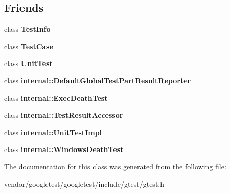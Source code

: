 \subsection*{Friends}
\begin{DoxyCompactItemize}
\item 
class {\bfseries Test\+Info}\hypertarget{classtesting_1_1TestResult_a4c49c2cdb6c328e6b709b4542f23de3c}{}\label{classtesting_1_1TestResult_a4c49c2cdb6c328e6b709b4542f23de3c}

\item 
class {\bfseries Test\+Case}\hypertarget{classtesting_1_1TestResult_aff779e55b06adfa7c0088bd10253f0f0}{}\label{classtesting_1_1TestResult_aff779e55b06adfa7c0088bd10253f0f0}

\item 
class {\bfseries Unit\+Test}\hypertarget{classtesting_1_1TestResult_a832b4d233efee1a32feb0f4190b30d39}{}\label{classtesting_1_1TestResult_a832b4d233efee1a32feb0f4190b30d39}

\item 
class {\bfseries internal\+::\+Default\+Global\+Test\+Part\+Result\+Reporter}\hypertarget{classtesting_1_1TestResult_abae39633da9932847b41cb80efd62115}{}\label{classtesting_1_1TestResult_abae39633da9932847b41cb80efd62115}

\item 
class {\bfseries internal\+::\+Exec\+Death\+Test}\hypertarget{classtesting_1_1TestResult_adf5553cae6aea6f8648d47e299237e34}{}\label{classtesting_1_1TestResult_adf5553cae6aea6f8648d47e299237e34}

\item 
class {\bfseries internal\+::\+Test\+Result\+Accessor}\hypertarget{classtesting_1_1TestResult_ae762da04e74a0d3b0daded3c5bd4a8e8}{}\label{classtesting_1_1TestResult_ae762da04e74a0d3b0daded3c5bd4a8e8}

\item 
class {\bfseries internal\+::\+Unit\+Test\+Impl}\hypertarget{classtesting_1_1TestResult_acc0a5e7573fd6ae7ad1878613bb86853}{}\label{classtesting_1_1TestResult_acc0a5e7573fd6ae7ad1878613bb86853}

\item 
class {\bfseries internal\+::\+Windows\+Death\+Test}\hypertarget{classtesting_1_1TestResult_a6aeedc04a0590fcc1b3c5f687dbb0f9f}{}\label{classtesting_1_1TestResult_a6aeedc04a0590fcc1b3c5f687dbb0f9f}

\end{DoxyCompactItemize}


The documentation for this class was generated from the following file\+:\begin{DoxyCompactItemize}
\item 
vendor/googletest/googletest/include/gtest/gtest.\+h\end{DoxyCompactItemize}
